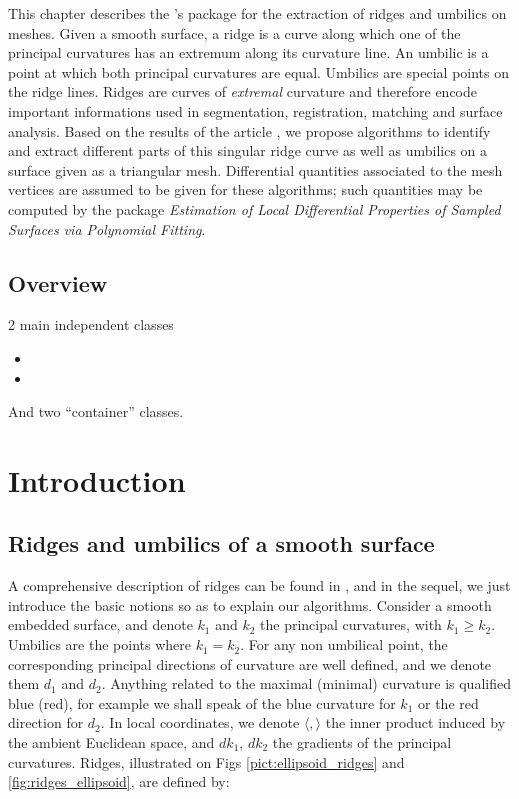 
\newtheorem{definition}{Definition.}
\newcommand{\hot}{h.o.t}%


This chapter describes the \cgal's package for the extraction of
ridges and umbilics on meshes.  Given a smooth surface, a ridge is a
curve along which one of the principal curvatures has an extremum
along its curvature line. An umbilic is a point at which both
principal curvatures are equal. Umbilics are special points on the
ridge lines. Ridges are curves of {\em extremal} curvature and
therefore encode important informations used in segmentation,
registration, matching and surface analysis.  Based on the results of
the article
, we propose algorithms to identify and extract
different parts of this singular ridge curve as well as umbilics on a
surface given as a triangular mesh. Differential quantities associated
to the mesh vertices are assumed to be given for these algorithms;
such quantities may be computed by the package {\em Estimation of
Local Differential Properties of Sampled Surfaces via Polynomial
Fitting}.


\subsection{Overview}

2 main independent classes

\begin{itemize}
\item
{}
\item
{}
\end{itemize}

And two ``container'' classes.

\section{Introduction}
\label{sec:intro}

\subsection{Ridges and umbilics of a smooth surface}

A comprehensive description of ridges can be found in
, and in the sequel, we just introduce the basic notions so as to
explain our algorithms.  Consider a smooth embedded surface, and
denote $k_1$ and $k_2$ the principal curvatures, with $k_1\geq
k_2$. Umbilics are the points where $k_1=k_2$.  For any non umbilical
point, the corresponding principal directions of curvature are well
defined, and we denote them $d_1$ and $d_2$.
Anything related to the maximal (minimal) curvature is qualified blue
(red), for example we shall speak of the blue curvature for $k_1$ or
the red direction for $d_2$.
In local coordinates, we denote $\langle , \rangle$
the inner product induced by the ambient Euclidean space, and $dk_1$,
$dk_2$ the gradients of the principal curvatures. Ridges, illustrated
on Figs \ref{pict:ellipsoid_ridges} and \ref{fig:ridges_ellipsoid},
are defined by:

